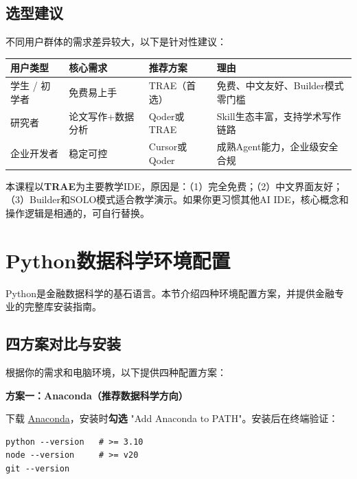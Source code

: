 \subsection{选型建议}

不同用户群体的需求差异较大，以下是针对性建议：

\begin{table}[H]
\centering
\begin{tabular}{lp{3.5cm}p{5cm}l}
\toprule
\textbf{用户类型} & \textbf{核心需求} & \textbf{推荐方案} & \textbf{理由} \\
\midrule
学生 / 初学者 & 免费易上手 & TRAE（首选） & 免费、中文友好、Builder模式零门槛 \\
研究者 & 论文写作+数据分析 & Qoder或TRAE & Skill生态丰富，支持学术写作链路 \\
企业开发者 & 稳定可控 & Cursor或Qoder & 成熟Agent能力，企业级安全合规 \\
\bottomrule
\end{tabular}
\end{table}

\begin{practicebox}[本课程推荐方案]
本课程以\textbf{TRAE}为主要教学IDE，原因是：（1）完全免费；（2）中文界面友好；（3）Builder和SOLO模式适合教学演示。如果你更习惯其他AI IDE，核心概念和操作逻辑是相通的，可自行替换。
\end{practicebox}

\section{Python数据科学环境配置}

Python是金融数据科学的基石语言。本节介绍四种环境配置方案，并提供金融专业的完整库安装指南。

\subsection{四方案对比与安装}

根据你的需求和电脑环境，以下提供四种配置方案：

\textbf{方案一：Anaconda（推荐数据科学方向）}

下载 \href{https://www.anaconda.com/download/}{Anaconda}，安装时\textbf{勾选} "Add Anaconda to PATH"。安装后在终端验证：

\begin{lstlisting}[style=shell]
python --version   # >= 3.10
node --version     # >= v20
git --version
\end{lstlisting}

